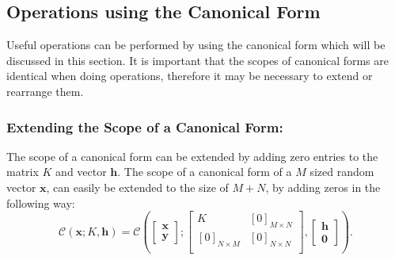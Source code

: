 \documentclass[12pt,oneside,openany,a4paper, %
afrikaans,english,
]{memoir}
\numberwithin{equation}{chapter}
\begin{document}
{\subsection{Operations using the Canonical Form}
Useful operations can be performed by using the canonical form which will be discussed in this section. It is important that the scopes of canonical forms are identical when doing operations, therefore it may be necessary to extend or rearrange them.
\subsubsection{Extending the Scope of a Canonical Form:}
The scope of a canonical form can be extended by adding zero entries to the matrix $K$ and vector $\bm{h}$. The scope of a canonical form of a $M$ sized random vector $\bm{x}$, can easily be extended to the size of $M + N$, by adding zeros in the following way:
\begin{equation}
\mathcal{C}\left(\bm{x};K,\bm{h}\right)
=
\mathcal{C}\left(
\begin{bmatrix}
\bm{x}\\
\bm{y}
\end{bmatrix};
\begin{bmatrix}
K & [0]_{M \times N}\\
[0]_{N \times M} & [0]_{N \times N}\\
\end{bmatrix},
\begin{bmatrix}
\bm{h}\\
\bm{0}
\end{bmatrix}
\right).
\end{equation}
}
\end{document}
